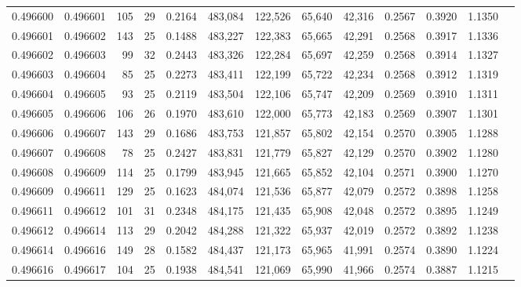\begin{tabular}{rrrrrrrrrrrrr}
0.496600 & 0.496601 & 105 &  29 &                                     0.2164 & 483,084 & 122,526 &  65,640 &  42,316 & 0.2567 & 0.3920 & 1.1350 \\
0.496601 & 0.496602 & 143 &  25 &                                     0.1488 & 483,227 & 122,383 &  65,665 &  42,291 & 0.2568 & 0.3917 & 1.1336 \\
0.496602 & 0.496603 &  99 &  32 &                                     0.2443 & 483,326 & 122,284 &  65,697 &  42,259 & 0.2568 & 0.3914 & 1.1327 \\
0.496603 & 0.496604 &  85 &  25 &                                     0.2273 & 483,411 & 122,199 &  65,722 &  42,234 & 0.2568 & 0.3912 & 1.1319 \\
0.496604 & 0.496605 &  93 &  25 &                                     0.2119 & 483,504 & 122,106 &  65,747 &  42,209 & 0.2569 & 0.3910 & 1.1311 \\
0.496605 & 0.496606 & 106 &  26 &                                     0.1970 & 483,610 & 122,000 &  65,773 &  42,183 & 0.2569 & 0.3907 & 1.1301 \\
0.496606 & 0.496607 & 143 &  29 &                                     0.1686 & 483,753 & 121,857 &  65,802 &  42,154 & 0.2570 & 0.3905 & 1.1288 \\
0.496607 & 0.496608 &  78 &  25 &                                     0.2427 & 483,831 & 121,779 &  65,827 &  42,129 & 0.2570 & 0.3902 & 1.1280 \\
0.496608 & 0.496609 & 114 &  25 &                                     0.1799 & 483,945 & 121,665 &  65,852 &  42,104 & 0.2571 & 0.3900 & 1.1270 \\
0.496609 & 0.496611 & 129 &  25 &                                     0.1623 & 484,074 & 121,536 &  65,877 &  42,079 & 0.2572 & 0.3898 & 1.1258 \\
0.496611 & 0.496612 & 101 &  31 &                                     0.2348 & 484,175 & 121,435 &  65,908 &  42,048 & 0.2572 & 0.3895 & 1.1249 \\
0.496612 & 0.496614 & 113 &  29 &                                     0.2042 & 484,288 & 121,322 &  65,937 &  42,019 & 0.2572 & 0.3892 & 1.1238 \\
0.496614 & 0.496616 & 149 &  28 &                                     0.1582 & 484,437 & 121,173 &  65,965 &  41,991 & 0.2574 & 0.3890 & 1.1224 \\
0.496616 & 0.496617 & 104 &  25 &                                     0.1938 & 484,541 & 121,069 &  65,990 &  41,966 & 0.2574 & 0.3887 & 1.1215 \\

\end{tabular}
